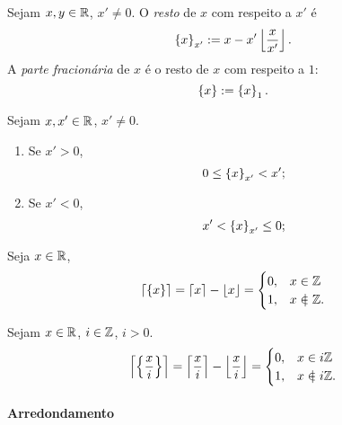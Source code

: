 \begin{definition}
Sejam $x,y \in \mathbb{R}$, $x' \neq 0$. O \emph{resto} de $x$ com respeito a $x'$ é
	\begin{equation*}
	\left\{ {x} \right\}_{x'} := x - x'\left\lfloor{\frac{x}{x'}}\right\rfloor.
	\end{equation*}
A \emph{parte fracionária} de $x$ é o resto de $x$ com respeito a $1$:
	\begin{equation*}
	\left\{ {x} \right\} := \left\{ {x} \right\}_{1}.
	\end{equation*}
\end{definition}

\begin{proposition}
Sejam $x,x' \in \mathbb{R}$, $x' \neq 0$.
	\begin{enumerate}
	\item Se $x'>0$,
		\begin{equation*}
		0 \leq \left\{ {x} \right\}_{x'} < x';
		\end{equation*}

	\item Se $x'<0$,
		\begin{equation*}
		x' < \left\{ {x} \right\}_{x'} \leq 0;
		\end{equation*}
	\end{enumerate}
\end{proposition}





\begin{proposition}
Seja $x \in \mathbb{R}$,
	\begin{equation*}
	\teto{\resfra{x}} = \teto{x} - \chao{x} = \begin{cases}
			0,& x \in \Z \\
			1,& x \notin \Z.
		\end{cases}
	\end{equation*}
\end{proposition}


\begin{proposition}
Sejam $x \in \mathbb{R}$, $i \in \mathbb{Z}$, $i > 0$.
	\begin{equation*}
	\teto{\resfra{ \frac{x}{i} }} = \teto{\frac{x}{i}} - \chao{\frac{x}{i}}  = \begin{cases}
			0,& x \in i\Z \\
			1,& x \notin i\Z.
		\end{cases}
	\end{equation*}
\end{proposition}


\paragraph{Arredondamento}

